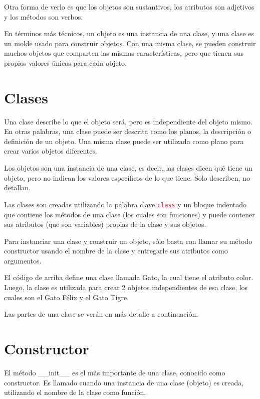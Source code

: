 \documentclass{report}
\newcommand{\ttt}[1]{
  \textcolor{Crimson}{\texttt{#1}}
}
\begin{document}
Otra forma de verlo es que los objetos son sustantivos, los atributos son adjetivos y los métodos son verbos.\smallskip

En términos más técnicos, un objeto es una instancia de una clase, y una clase es un molde usado para construir objetos. Con una misma clase, se pueden construir muchos objetos que comparten las mismas características, pero que tienen sus propios valores únicos para cada objeto.

\section{Clases}


Una clase describe lo que el objeto será, pero es independiente del objeto mismo. En otras palabras, una clase puede ser descrita como los planos, la descripción o definición de un objeto. Una misma clase puede ser utilizada como plano para crear varios objetos diferentes.\smallskip

Los objetos son una instancia de una clase, es decir, las clases dicen qué tiene un objeto, pero no indican los valores específicos de lo que tiene. Solo describen, no detallan.\smallskip

Las clases son creadas utilizando la palabra clave \ttt{class} y un bloque indentado que contiene los métodos de una clase (los cuales son funciones) y puede contener sus atributos (que son variables) propias de la clase y sus objetos.\smallskip

Para instanciar una clase y construir un objeto, sólo basta con llamar su método constructor usando el nombre de la clase y entregarle sus atributos como argumentos.


El código de arriba define una clase llamada Gato, la cual tiene el atributo color. Luego, la clase es utilizada para crear 2 objetos independientes de esa clase, los cuales son el Gato Félix y el Gato Tigre.\smallskip

Las partes de una clase se verán en más detalle a continuación.

\section{Constructor}

El método \_\_init\_\_ es el más importante de una clase, conocido como constructor. Es llamado cuando una instancia de una clase (objeto) es creada, utilizando el nombre de la clase como función.\smallskip
\end{document}
